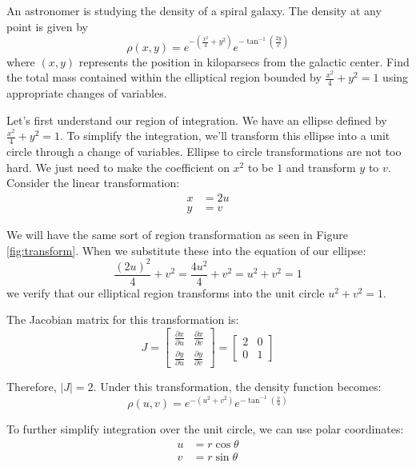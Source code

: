 \begin{example}
An astronomer is studying the density of a spiral galaxy. The density at any point is given by 
\[
\rho(x,y) = e^{-\left(\frac{x^2}{4} + y^2\right)} e^{-\tan^{-1}\left(\frac{2y}{x}\right)}
\]
where \((x,y)\) represents the position in kiloparsecs from the galactic center. Find the total mass contained within the elliptical region bounded by \(\frac{x^2}{4} + y^2 = 1\) using appropriate changes of variables.

\begin{solution}
\noindent Let's first understand our region of integration. We have an ellipse defined by \(\frac{x^2}{4} + y^2 = 1\). To simplify the integration, we'll transform this ellipse into a unit circle through a change of variables. Ellipse to circle transformations are not too hard. We just need to make the coefficient on $x^2$ to be $1$ and transform $y$ to $v$.\\

\noindent Consider the linear transformation:
\begin{align*}
x &= 2u \\
y &= v
\end{align*}

\noindent We will have the same sort of region transformation as seen in Figure \ref{fig:transform}. When we substitute these into the equation of our ellipse:
\[
\frac{(2u)^2}{4} + v^2 = \frac{4u^2}{4} + v^2 = u^2 + v^2 = 1
\]
we verify that our elliptical region transforms into the unit circle \(u^2 + v^2 = 1\).

\noindent The Jacobian matrix for this transformation is:
\[
J = \begin{bmatrix}
\frac{\partial x}{\partial u} & \frac{\partial x}{\partial v} \\[1ex]
\frac{\partial y}{\partial u} & \frac{\partial y}{\partial v}
\end{bmatrix} = \begin{bmatrix}
2 & 0 \\
0 & 1
\end{bmatrix}
\]

\noindent Therefore, \(|J| = 2\). Under this transformation, the density function becomes:
\[
\rho(u,v) = e^{-(u^2 + v^2)} e^{-\tan^{-1}\left(\frac{v}{u}\right)}
\]

\noindent To further simplify integration over the unit circle, we can use polar coordinates:
\begin{align*}
u &= r\cos\theta \\
v &= r\sin\theta
\end{align*}


\end{solution}
\end{example}

